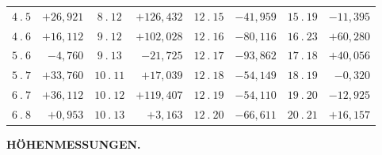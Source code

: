 {\begin{tabular}{|c|r||c|r||c|r||c|r|}
\(4\ .\ 5\) & \(+26{,}921\) & \(8\ .\ 12\) & \(+126{,}432\) & \(12\ .\ 15\) & \(-41{,}959\) & \(15\ .\ 19\) & \(-11{,}395\)\\
\(4\ .\ 6\) & \(+16{,}112\) & \(9\ .\ 12\) & \(+102{,}028\) & \(12\ .\ 16\) & \(-80{,}116\) & \(16\ .\ 23\) & \(+60{,}280\)\\
\(5\ .\ 6\) & \(-4{,}760\) & \(9\ .\ 13\) & \(-21{,}725\) & \(12\ .\ 17\) & \(-93{,}862\) & \(17\ .\ 18\) & \(+40{,}056\)\\
\(5\ .\ 7\) & \(+33{,}760\) & \(10\ .\ 11\) & \(+17{,}039\) & \(12\ .\ 18\) & \(-54{,}149\) & \(18\ .\ 19\) & \(-0{,}320\)\\
\(6\ .\ 7\) & \(+36{,}112\) & \(10\ .\ 12\) & \(+119{,}407\) & \(12\ .\ 19\) & \(-54{,}110\) & \(19\ .\ 20\) & \(-12{,}925\)\\
\(6\ .\ 8\) & \(+0{,}953\) & \(10\ .\ 13\) & \(+3{,}163\) & \(12\ .\ 20\) & \(-66{,}611\) & \(20\ .\ 21\) & \(+16{,}157\)\\
\end{tabular}\par}

\par\clearpage
\noindent\null\hfill{\small\textbf{HÖHENMESSUNGEN.}}\hfill{}\par\medskip

